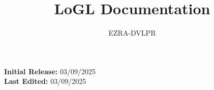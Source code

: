 \documentclass[letterpaper,12pt]{article}
\begin{document}
\title{LoGL Documentation}

\author{EZRA-DVLPR}

\date{} %

\maketitle

\begin{center}
	\textbf{Initial Release:} 03/09/2025\\
	\textbf{Last Edited:} 03/09/2025\\
\end{center}

\tableofcontents

\newpage








\end{document}
